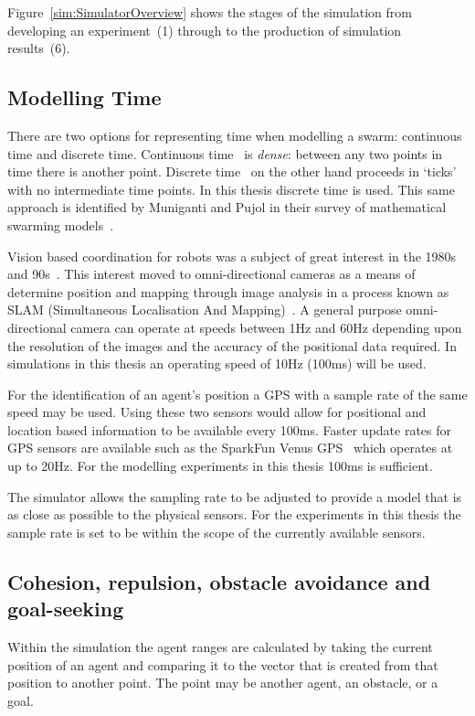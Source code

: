 Figure~\ref{sim:SimulatorOverview} shows the stages of the simulation from developing an experiment~(1) through to the production of simulation results~(6).

\subsection{Modelling Time}\label{sim:time}
There are two options for representing time when modelling a swarm: continuous time and discrete time. Continuous time~\cite{HW:08} is \textit{dense}: between any two points in time there is another point. Discrete time~\cite{FAP:05, GP:05, RVMH:13, HER:11, MP:10, PCL:08a} on the other hand proceeds in `ticks' with no intermediate time points. In this thesis discrete time is used. This same approach is identified by Muniganti and Pujol in their survey of mathematical swarming models~\cite{MP:10}. 

Vision based coordination for robots was a subject of great interest in the 1980s and 90s~\cite{DK:02}. This interest moved to omni-directional cameras as a means of determine position and mapping through image analysis in a process known as SLAM (Simultaneous Localisation And Mapping)~\cite{TRI:15,SG:15}. A general purpose omni-directional camera can operate at speeds between 1Hz and 60Hz depending upon the resolution of the images and the accuracy of the positional data required. In simulations in this thesis an operating speed of 10Hz (100ms) will be used. 

For the identification of an agent's position a GPS with a sample rate of the same speed may be used. Using these two sensors would allow for positional and location based information to be available every 100ms. Faster update rates for GPS sensors are available such as the SparkFun Venus GPS~\cite{SF:16} which operates at up to 20Hz. For the modelling experiments in this thesis 100ms is sufficient.

The simulator allows the sampling rate to be adjusted to provide a model that is as close as possible to the physical sensors. For the experiments in this thesis the sample rate is set to be within the scope of the currently available sensors.

\subsection{Cohesion, repulsion, obstacle avoidance and goal-seeking}
Within the simulation the agent ranges are calculated by taking the current position of an agent and comparing it to the vector that is created from that position to  another point. The point may be another agent, an obstacle, or a goal.

